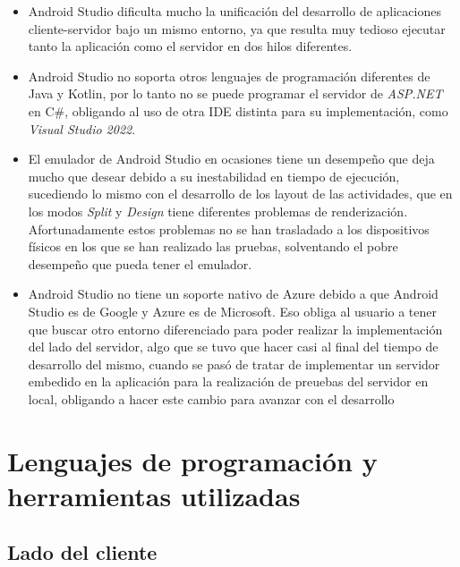 \begin{itemize}
    \item Android Studio dificulta mucho la unificación del desarrollo de
    aplicaciones cliente-servidor bajo un mismo entorno, ya que resulta muy
    tedioso ejecutar tanto la aplicación como el servidor en dos hilos
    diferentes.
    \item Android Studio no soporta otros lenguajes de programación diferentes
    de Java y Kotlin, por lo tanto no se puede programar el servidor de
    \textit{ASP.NET} en C\#, obligando al uso de otra IDE distinta para su
    implementación, como \textit{Visual Studio 2022}.
    \item El emulador de Android Studio en ocasiones tiene un desempeño que deja
    mucho que desear debido a su inestabilidad en tiempo de ejecución,
    sucediendo lo mismo con el desarrollo de los layout de las actividades, que
    en los modos \textit{Split} y \textit{Design} tiene diferentes problemas de
    renderización. Afortunadamente estos problemas no se han trasladado a los
    dispositivos físicos en los que se han realizado las pruebas, solventando el
    pobre desempeño que pueda tener el emulador.
    \item Android Studio no tiene un soporte nativo de Azure debido a que
    Android Studio es de Google y Azure es de Microsoft. Eso obliga al usuario a
    tener que buscar otro entorno diferenciado para poder realizar la
    implementación del lado del servidor, algo que se tuvo que hacer casi al
    final del tiempo de desarrollo del mismo, cuando se pasó de tratar de
    implementar un servidor embedido en la aplicación para la realización de
    preuebas del servidor en local, obligando a hacer este cambio para avanzar
    con el desarrollo
\end{itemize}
    
\section{Lenguajes de programación y herramientas utilizadas}
\subsection{Lado del cliente}

